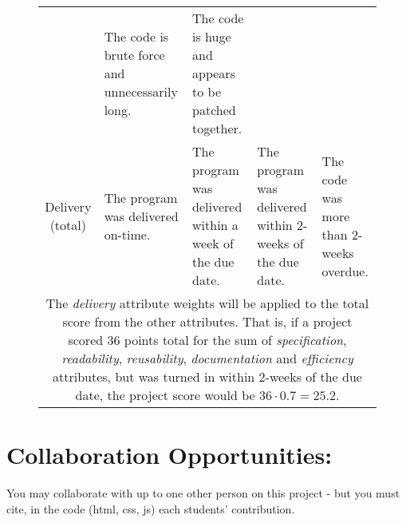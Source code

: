 \documentclass[10pt]{article}
\begin{document}
\begin{figure}
\begin{center}
\begin{tabular}{c p{1.2in} p{1.2in} p{1.2in} p{1.2in}}
                     & The code is brute force and unnecessarily long.
                     & The code is huge and appears to be patched together. \\
      Delivery (total) & The program was delivered on-time.
                       & The program was delivered within a week of the due date. 
                       & The program was delivered within 2-weeks of the due date. 
                       & The code was more than 2-weeks overdue. \\ \hline
      \multicolumn{5}{p{\textwidth}}{The \emph{delivery} attribute weights will be applied to the total score from the other attributes. That is, if a project scored 36 points total for the sum of \emph{specification}, \emph{readability}, \emph{reusability}, \emph{documentation} and \emph{efficiency} attributes, but was turned in within 2-weeks of the due date, the project score would be $36 \cdot 0.7 = 25.2$.}
   \end{tabular}
 \end{center}
\end{figure}

\section*{Collaboration Opportunities:}

You may collaborate with up to one other person on this project - but you must cite, in the code (html, css, js) each students' contribution.
\end{document}
